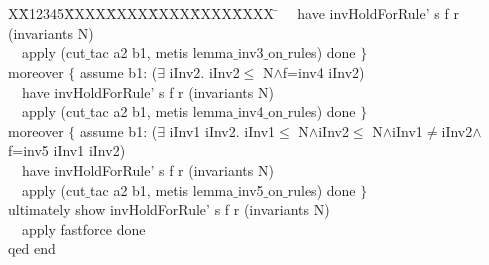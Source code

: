 \documentclass{llncs}
\newlength{\fminilength}
\newenvironment{fmini}[1][\linewidth]
  {\setlength{\fminilength}{#1\fboxsep-2\fboxrule}%
   \vspace{2ex}\noindent\begin{lrbox}{\fminibox}\begin{minipage}{\fminilength}%
   \mbox{ }\hfill\vspace{-2.5ex}}%
  {\end{minipage}\end{lrbox}\vspace{1ex}\hspace{0ex}%
   \framebox{\usebox{\fminibox}}}
\newenvironment{specification}
{\noindent\scriptsize
\tt\begin{fmini}\begin{tabbing}X\=X12345\=XXXX\=XXXX\=XXXX\=XXXX\=XXXX
\=\+\kill} {\end{tabbing}\normalfont\end{fmini}}
\def \twoSpaces {\ \ }
\def \iInv {iInv}
\begin{document}
\begin{specification}
\twoSpaces       have
invHoldForRule' s f r (invariants N)\\

\twoSpaces      apply (cut$\_$tac a2 b1, metis lemma$\_$inv3$\_$on$\_$rules) done
    $\}$\\


    moreover $\{$      assume b1:
($\exists$ \iInv2. \iInv2$\le$
N$\wedge$f=inv4  \iInv2)\\

\twoSpaces       have
invHoldForRule' s f r (invariants N)\\

\twoSpaces      apply (cut$\_$tac a2 b1, metis lemma$\_$inv4$\_$on$\_$rules) done
    $\}$\\


    moreover $\{$
      assume b1:
($\exists$ \iInv1 \iInv2. \iInv1$\le$
N$\wedge$\iInv2$\le$
N$\wedge$\iInv1$\neq$\iInv2$\wedge$f=inv5  \iInv1 \iInv2)\\

\twoSpaces       have
invHoldForRule' s f r (invariants N)\\

\twoSpaces      apply (cut$\_$tac a2 b1, metis lemma$\_$inv5$\_$on$\_$rules) done
    $\}$\\


  ultimately show
invHoldForRule' s f r (invariants N)\\

\twoSpaces  apply fastforce done\\
qed
end\\
\end{specification}



\end{document}
